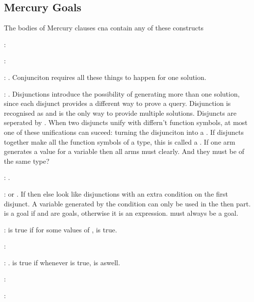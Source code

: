 \subsection{Mercury Goals}
The bodies of Mercury clauses cna contain any of these constructs 
\begin{compactitem}
\item {}: 
\item {}: 
\item {}: . Conjunciton requires all these things to happen for one solution.
\item {}: . Disjunctions introduce the possibility of generating
more than one solution, since each disjunct provides
a different way to prove a query. Disjunction is recognised as  and is the only way to provide multiple solutions. Disjuncts are seperated by . When two disjuncts unify with differn't function symbols, at most one of these unifications can suceed: turning the disjunciton into a . If disjuncts together make all the function symbols of a type, this is called a . If one arm generates a value for a variable then all arms must clearly. And they must be of the same type?
\item {}: . 
\item {}:  or
. If then else look like disjunctions with an extra condition on the first disjunct. A variable generated by the condition can only be used in the then part.  is a goal if  and  are goals, otherwise it is an expression.  must always be a goal. 
\item {}:
 is true if for some values of \e{[V1,...,Vn]},  is true.
\item {}:
\item {}: .  is true if whenever  is true,  is aswell.
\item {}:
\item {}:
\end{compactitem}

